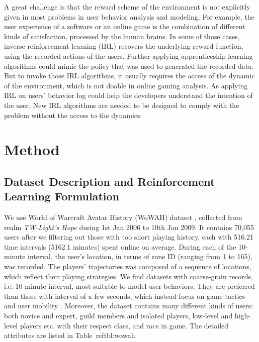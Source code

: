 \documentclass{sigchi}
\begin{document}
A great challenge is that the reward scheme of the environment is not explicitly given in most problems in user behavior analysis and modeling. 
For example, the user experience of a software or an online game is the combination of different kinds of satisfaction, processed by the human brains.
In some of those cases, inverse reinforcement learning (IRL) \cite{ratliff2006maximum,ng2000algorithms} recovers the underlying reward function, using the recorded actions of the users.
Further applying apprenticeship learning algorithms \cite{abbeel2004apprenticeship} could mimic the policy that was used to generated the recorded data.
But to invoke those IRL algorithms, it usually requires the access of the dynamic of the environment, which is not doable in online gaming analysis. 
As applying IRL on users' behavior log could help the developers understand the intention of the user, New IRL algorithms are needed to be designed to comply with the problem without the access to the dynamics.

\section{Method}

\subsection{Dataset Description and Reinforcement Learning Formulation}

We use World of Warcraft Avatar History (WoWAH) dataset \cite{lee2011world}, collected from realm \textit{TW-Light's Hope} during 1st Jan 2006 to 10th Jan 2009. 
It contains 70,055 users after we filtering out those with too short playing history, each with 516.21 time intervals (5162.1 minutes) spent online on average.
During each of the 10-minute interval, the user's location, in terms of zone ID (ranging from 1 to 165), was recorded.
The players' trajectories was composed of a sequence of locations, which reflect their playing strategies.
We find datasets with coarse-grain records, i.e. 10-minute interval, most suitable to model user behaviors. 
They are preferred than those with interval of a few seconds, which instead focus on game tactics and user mobility \cite{Bell2013a,shen2014characterization}.
Moreover, the dataset contains many different kinds of users: both novice and expert, guild members and isolated players, low-level and high-level players etc. with their respect class, and race in game. 
The detailed attributes are listed in Table~ref{tbl:wowah}.
\end{document}
